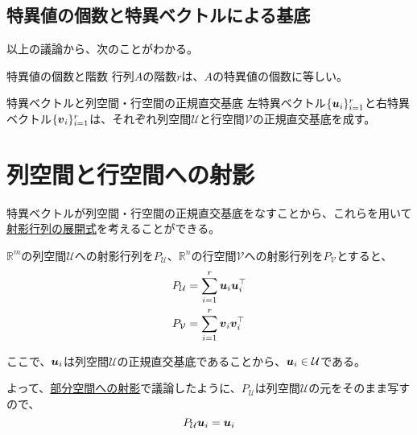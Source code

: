 \documentclass[../../../topic_linear-algebra]{subfiles}
\begin{document}
\subsection{特異値の個数と特異ベクトルによる基底}

以上の議論から、次のことがわかる。

\begin{theorem}{特異値の個数と階数}
  行列$A$の階数$r$は、$A$の特異値の個数に等しい。
\end{theorem}

\begin{theorem}{特異ベクトルと列空間・行空間の正規直交基底}
  左特異ベクトル$\{\vb*{u}_i\}_{i=1}^r$と右特異ベクトル$\{\vb*{v}_i\}_{i=1}^r$は、それぞれ列空間$\mathcal{U}$と行空間$\mathcal{V}$の正規直交基底を成す。
\end{theorem}

\sectionline
\section{列空間と行空間への射影}

特異ベクトルが列空間・行空間の正規直交基底をなすことから、これらを用いて\hyperref[sec:projection-matrix-expansion]{射影行列の展開式}を考えることができる。

\br

$\mathbb{R}^m$の列空間$\mathcal{U}$への射影行列を$P_{\mathcal{U}}$、$\mathbb{R}^n$の行空間$\mathcal{V}$への射影行列を$P_{\mathcal{V}}$とすると、
\begin{align*}
  P_{\mathcal{U}} & = \sum_{i=1}^r \vb*{u}_i \vb*{u}_i^\top \\
  P_{\mathcal{V}} & = \sum_{i=1}^r \vb*{v}_i \vb*{v}_i^\top
\end{align*}

\br

ここで、$\vb*{u}_i$は列空間$\mathcal{U}$の正規直交基底であることから、$\vb*{u}_i \in \mathcal{U}$である。

よって、\hyperref[sec:projection-onto-subspace]{部分空間への射影}で議論したように、$P_{\mathcal{U}}$は列空間$\mathcal{U}$の元をそのまま写すので、
\begin{equation*}
  P_{\mathcal{U}}\vb*{u}_i = \vb*{u}_i
\end{equation*}
\end{document}
